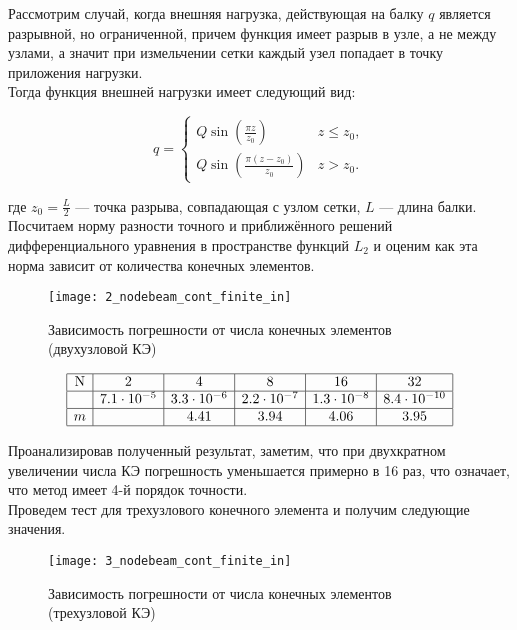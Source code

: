 \documentclass[12pt,a4paper]{article}
\begin{document}
Рассмотрим случай, когда внешняя нагрузка, действующая на балку $q$ является разрывной, но ограниченной, причем функция имеет разрыв в узле, а не между узлами, а значит при измельчении сетки каждый узел попадает в точку приложения нагрузки. \\

 Тогда функция внешней нагрузки имеет следующий вид:

\begin{equation}
q = 
 \begin{cases}
	Q \sin \left(\frac{\pi  z}{z_{0}}\right) & z \leq z_{0},\\
    Q \sin \left(\frac{\pi  (z-z_{0})}{z_{0}}\right) & z > z_{0}.
 \end{cases}
\end{equation}

где $z_{0}=\frac{L}{2}$ --- точка разрыва, совпадающая с узлом сетки, $L$ --- длина балки. \\

Посчитаем норму разности точного и приближённого решений дифференциального уравнения в пространстве функций $L_{2}$  и оценим как эта норма зависит от количества конечных элементов.\\

\begin{figure}[H]
	\centering
	\texttt{[image: 2\_nodebeam\_cont\_finite\_in]}
	\caption{Зависимость погрешности от числа конечных элементов (двухузловой КЭ)}
	\label{fig:2_nodebeam_cont_finite_in}
\end{figure}
\[
\begin{array}{|c|c|c|c|c|c|}
	\hline
	\text{N} & 2 & 4 & 8 & 16 & 32 \\ \hline
\Delta  & 7.1 \cdot 10^{-5} & 3.3 \cdot 10^{-6} & 2.2 \cdot 10^{-7} & 1.3 \cdot 10^{-8} & 8.4 \cdot 10^{-10}\\ \hline
m  &  & 4.41 & 3.94 & 4.06 & 3.95 \\ 
	\hline
	\end{array}
	\]

Проанализировав полученный результат, заметим, что при двухкратном увеличении числа КЭ погрешность уменьшается примерно в 16 раз, что означает, что метод имеет 4-й порядок точности.\\

 Проведем тест для трехузлового конечного элемента и получим следующие значения. 
\begin{figure}[H]
		\centering
		\texttt{[image: 3\_nodebeam\_cont\_finite\_in]}
		\caption{Зависимость погрешности от числа конечных элементов (трехузловой КЭ)}
		\label{fig:3_nodebeam_cont_finite_in}
	\end{figure}
\end{document}
